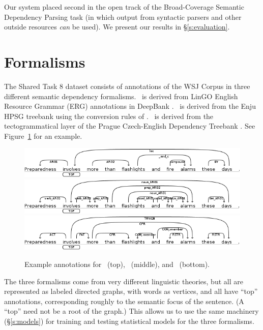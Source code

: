 \documentclass[11pt]{article}
\newcommand{\sam}[1]{\textcolor{blue}{[#1 -SMT]}}
\renewcommand{\sam}[1]{}
\begin{document}
Our system placed second in the open track of the Broad-Coverage Semantic
Dependency Parsing task (in which output from syntactic parsers and other outside resources \emph{can} be used).
We present our results in \S\ref{s:evaluation}.



\section{Formalisms} \label{s:formalisms}
The Shared Task 8 dataset consists of annotations of the WSJ Corpus in
three different semantic dependency formalisms.
\DM\ is derived from LinGO English Resource Grammar (ERG)
annotations in DeepBank \citep{flickinger_deepbank_2012}.
\PAS\ is derived from the Enju HPSG treebank using the
conversion rules of \citet{miyao_corpus_oriented_2004}.
\PCEDT\ is derived from the tectogrammatical layer of the
Prague Czech-English Dependency Treebank \citep{hajic_building_1998}.
See Figure~\ref{fig:formalisms} for an example.
\begin{figure}
	\centering
		\includegraphics[width=.5\textwidth]{fig/example_dm} \\
		\includegraphics[width=.5\textwidth]{fig/example_pas} \\
		\includegraphics[width=.5\textwidth]{fig/example_pcedt}
	\caption{Example annotations for \DM\ (top), \PAS\ 
          (middle), and \PCEDT\ (bottom).}
	\label{fig:formalisms}
\end{figure}

The three formalisms come from very different linguistic theories, but all
are represented as labeled directed graphs, with words as vertices, and
all have ``top'' annotations, corresponding roughly to the
semantic focus of the sentence.  
(A ``top'' need not be a root of the
graph.)
This allows us to use the same machinery (\S\ref{s:models}) for
training and testing statistical models for the three formalisms.
\sam{Stats about \% multiple roots, \% multiple tops, \% tree, \% acyclic}
\end{document}
